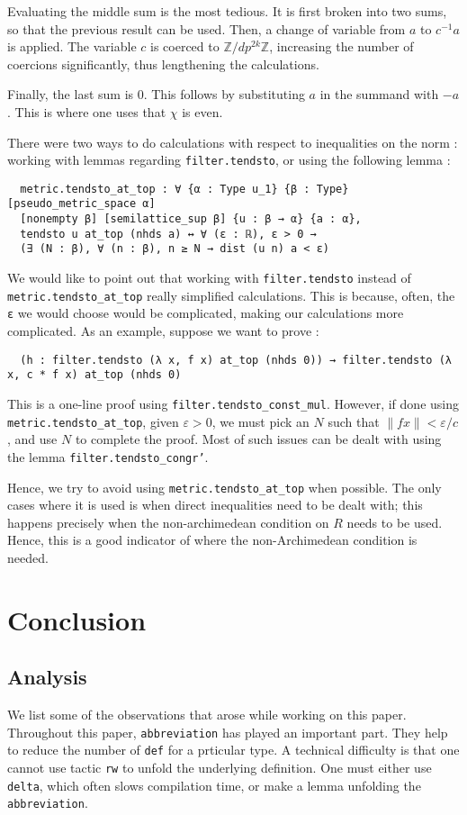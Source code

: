 \documentclass[a4paper,UKenglish,cleveref, autoref, thm-restate]{lipics-v2021}
\newcommand{\lean}[1]{\texttt{#1}\xspace} %
\begin{document}
Evaluating the middle sum is the most tedious. It is first broken into two sums, so that the previous result can be used. Then, a 
change of variable from $a$ to $c^{-1} a$ is applied. The variable $c$ is coerced to $\mathbb{Z}/ d p^{2k} \mathbb{Z}$, increasing 
the number of coercions significantly, thus lengthening the calculations. 

Finally, the last sum is 0. This follows by substituting $a$ in the summand with $-a$. This is where one uses that $\chi$ is even. 

There were two ways to do calculations with respect to inequalities on the norm : working with lemmas regarding \lean{filter.tendsto}, 
or using the following lemma : 
\begin{lstlisting}
  metric.tendsto_at_top : ∀ {α : Type u_1} {β : Type} [pseudo_metric_space α] 
  [nonempty β] [semilattice_sup β] {u : β → α} {a : α}, 
  tendsto u at_top (nhds a) ↔ ∀ (ε : ℝ), ε > 0 → 
  (∃ (N : β), ∀ (n : β), n ≥ N → dist (u n) a < ε)
\end{lstlisting}
We would like to point out that working with \lean{filter.tendsto} instead of \lean{metric.tendsto\_at\_top} really simplified 
calculations. This is because, often, the \lean{ε} we would choose would be complicated, making our calculations more 
complicated. As an example, suppose we want to prove :
\begin{lstlisting}
  (h : filter.tendsto (λ x, f x) at_top (nhds 0)) → filter.tendsto (λ x, c * f x) at_top (nhds 0)
\end{lstlisting}
This is a one-line proof using \lean{filter.tendsto\_const\_mul}. However, if done using \lean{metric.tendsto\_at\_top}, 
given $\varepsilon > 0$, we must pick an $N$ such that $\lVert f x \rVert < \varepsilon / c$, and use $N$ to complete the proof. 
Most of such issues can be dealt with using the lemma \lean{filter.tendsto\_congr'}. 

Hence, we try to avoid using \lean{metric.tendsto\_at\_top} when possible. The only cases where it is used is when direct inequalities 
need to be dealt with; this happens precisely when the non-archimedean condition on $R$ needs to be used. Hence, this is a good 
indicator of where the non-Archimedean condition is needed.

\section{Conclusion}
\label{section5}
\subsection{Analysis}
We list some of the observations that arose while working on this paper. 
Throughout this paper, \lean{abbreviation} has played an important part. They help to reduce the number of \lean{def} for a prticular type. A technical 
difficulty is that one cannot use tactic \lean{rw} to unfold the underlying definition. One must either use \lean{delta}, which often slows compilation 
time, or make a lemma unfolding the \lean{abbreviation}.  
\end{document}
